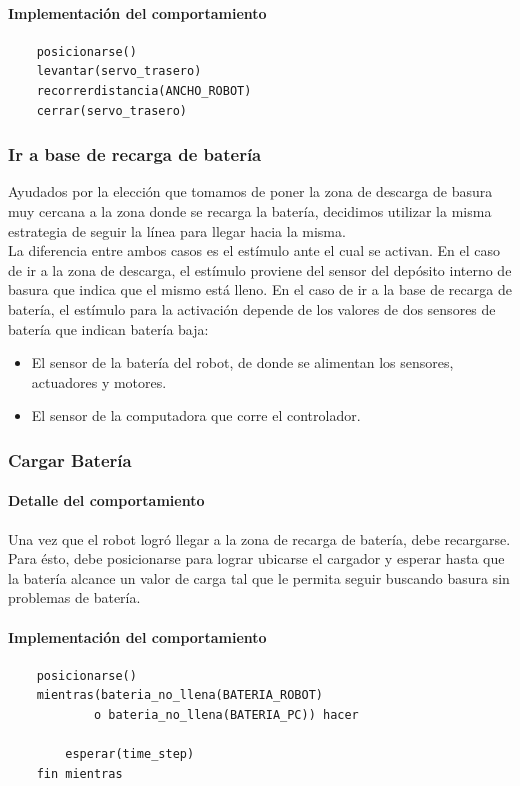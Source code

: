 \paragraph{Implementaci\'on del comportamiento}
\begin{verbatim}
    posicionarse()
    levantar(servo_trasero)
    recorrerdistancia(ANCHO_ROBOT)
    cerrar(servo_trasero)
\end{verbatim}

\subsubsection{Ir a base de recarga de bater\'ia}
\label{go_to_recharge}
Ayudados por la elecci\'on que tomamos de poner la zona de descarga de basura
muy cercana a la zona donde se recarga la bater\'ia, decidimos utilizar la
misma estrategia de seguir la l\'inea para llegar hacia la misma.
\\\indent
La diferencia
entre ambos casos es el est\'imulo ante el cual se activan. En el caso de
ir a la zona de descarga, el est\'imulo proviene del sensor del dep\'osito
interno de basura que indica que el mismo est\'a lleno. En el caso de ir
a la base de recarga de bater\'ia, el est\'imulo para la activaci\'on depende
de los valores de dos sensores de bater\'ia que indican bater\'ia baja:
\begin{itemize}
	\item El sensor de la bater\'ia del robot, de donde se alimentan los sensores,
			actuadores y motores.
	\item El sensor de la computadora que corre el controlador.
\end{itemize}

\subsubsection{Cargar Bater\'ia}
\label{recharge_battery}
\paragraph{Detalle del comportamiento}
Una vez que el robot logr\'o llegar a la zona de recarga de bater\'ia, debe
recargarse. Para \'esto, debe posicionarse para lograr ubicarse el cargador
y esperar hasta que la bater\'ia alcance un valor de carga tal que le
permita seguir buscando basura sin problemas de bater\'ia.

\paragraph{Implementaci\'on del comportamiento}
\begin{verbatim}
    posicionarse()
    mientras(bateria_no_llena(BATERIA_ROBOT)
            o bateria_no_llena(BATERIA_PC)) hacer

        esperar(time_step)
    fin mientras
\end{verbatim}

